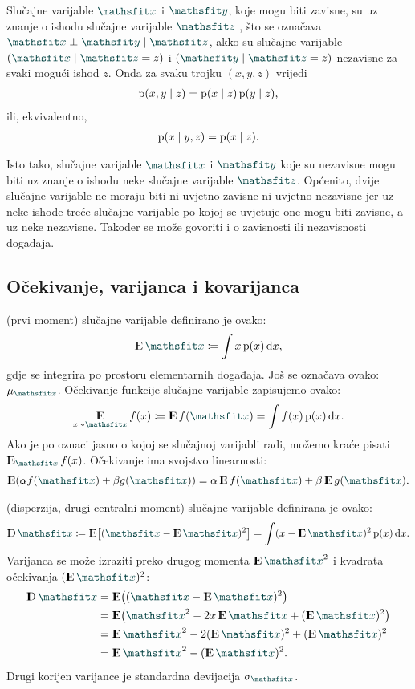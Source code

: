 \documentclass[utf8, diplomski, lmodern]{fer}
\begin{document}
Slučajne varijable $\rvar x$ i $\rvar y$, koje mogu biti zavisne, su uz znanje o ishodu slučajne varijable $\rvar z$ , što se označava $\rvar x\perp\rvar y\mid\rvar z$, akko su slučajne varijable $\del{\rvar x\mid\rvar z=z}$ i $\del{\rvar y\mid\rvar z=z}$ nezavisne za svaki mogući ishod $z$. Onda za svaku trojku $(x,y,z)$ vrijedi
\begin{align}
\operatorname*{\mathrm{p}}(x,y\mid z) = \operatorname*{\mathrm{p}}(x\mid z)\operatorname*{\mathrm{p}}(y\mid z) \text{,}
\end{align}
 ili, ekvivalentno,
\begin{align}
\operatorname*{\mathrm{p}}(x\mid y,z) = \operatorname*{\mathrm{p}}(x\mid z) \text{.}
\end{align}

Isto tako, slučajne varijable $\rvar x$ i $\rvar y$ koje su nezavisne mogu biti  uz znanje o ishodu neke slučajne varijable $\rvar z$. Općenito, dvije slučajne varijable ne moraju biti ni uvjetno zavisne ni uvjetno nezavisne jer uz neke ishode treće slučajne varijable po kojoj se uvjetuje one mogu biti zavisne, a uz neke nezavisne. Također se može govoriti i o zavisnosti ili nezavisnosti događaja.

\subsection{Očekivanje, varijanca i kovarijanca}

 (prvi moment) slučajne varijable definirano je ovako:
\begin{align}
\E\rvar x \coloneqq \int x\p(x)\dif x \text{,}
\end{align}
gdje se integrira po prostoru elementarnih događaja. Još se označava ovako: $\mu_{\rvar x}$. Očekivanje funkcije slučajne varijable zapisujemo ovako:
\begin{align}
\E_{x\sim\rvar x} f(x) \coloneqq \E f(\rvar x) = \int f(x)\p(x)\dif x \text{.}
\end{align}
Ako je po oznaci jasno o kojoj se slučajnoj varijabli radi, možemo kraće pisati $\E_{\rvar x} f(x)$. Očekivanje ima svojstvo linearnosti:
\begin{align}
\E\del{\alpha f(\rvar x)+\beta g(\rvar x)} = \alpha\E f(\rvar x)+\beta\E g(\rvar x) \text{.}
\end{align}

 (disperzija, drugi centralni moment) slučajne varijable definirana je ovako:
\begin{align}
\D\rvar x \coloneqq \E\sbr{\del{\rvar x-\E \rvar x}^2} = \int (x-\E \rvar x)^2 \p(x)\dif x \text{.}
\end{align}
Varijanca se može izraziti preko drugog momenta $\E{\rvar x}^2$ i kvadrata očekivanja $\del{\E\rvar x}^2$:
\begin{align}
\D\rvar x 
&= \E\del{\del{\rvar x-\E \rvar x}^2} \\
&= \E\del{{\rvar x}^2-2x\E \rvar x+\del{\E\rvar x}^2} \\
&= \E{\rvar x}^2-2\del{\E\rvar x}^2+\del{\E\rvar x}^2 \\
&= \E{\rvar x}^2 - \del{\E\rvar x}^2  \text{.} \label{eq:varijanca-izrazavanje-momenti}
\end{align}
Drugi korijen varijance je standardna devijacija $\sigma_{\rvar x}$.
\end{document}
